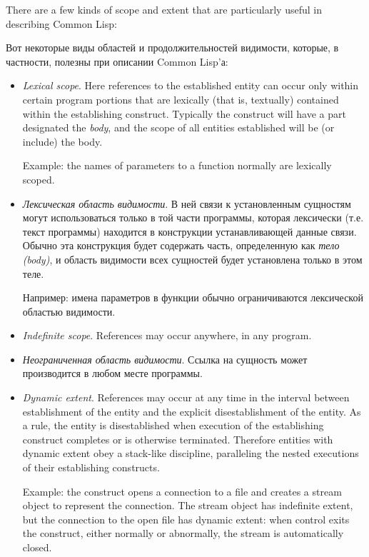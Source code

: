 There are a few kinds of scope and extent that are particularly useful
in describing Common Lisp:

Вот некоторые виды областей и продолжительностей видимости, которые, в частности,
полезны при описании Common Lisp'а:

\begin{itemize}
\item
\emph{Lexical scope}.  Here references to the established
entity can occur only within certain program portions that are
lexically (that is, textually) contained within the establishing construct.
Typically the construct will have a part designated the \emph{body},
and the scope of all entities established will be (or include) the body.

Example: the names of parameters to a function normally are lexically scoped.

\item 
\emph{Лексическая область видимости}. В ней связи к установленным сущностям могут
использоваться только в той части программы, которая лексически (т.е. текст
программы) находится в конструкции устанавливающей данные связи. Обычно эта
конструкция будет содержать часть, определенную как \emph{тело (body)}, и область
видимости всех сущностей будет установлена только в этом теле.

Например: имена параметров в функции обычно ограничиваются лексической областью
видимости.

\item
\emph{Indefinite scope}.  References may occur anywhere, in any program.

\item
\emph{Неограниченная область видимости}. Ссылка на сущность может производится в
любом месте программы.

\item
\emph{Dynamic extent}.  References may occur at any time in the interval
between establishment of the entity and the explicit disestablishment
of the entity.  As a rule, the entity is disestablished when execution
of the establishing construct completes or is otherwise terminated.
Therefore entities with dynamic extent obey a stack-like discipline,
paralleling the nested executions of their establishing constructs.

Example: the  construct opens a connection to a file
and creates a stream object to represent the connection.  The stream object
has indefinite extent, but the connection to the open file has dynamic extent:
when control exits the  construct, either normally
or abnormally, the stream is automatically closed.


\end{itemize}
